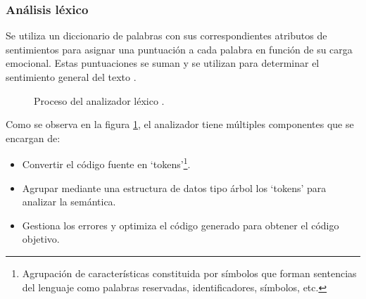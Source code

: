 \documentclass[12pt,twoside]{article}
\begin{document}
	\subsubsection{Análisis léxico}
	Se utiliza un diccionario de palabras con sus correspondientes atributos de sentimientos para asignar una puntuación a cada palabra en función de su carga emocional. Estas puntuaciones se suman y se utilizan para determinar el sentimiento general del texto \cite{info: pln3}.
	
	\begin{figure}[H]
		\centering
		\caption{Proceso del analizador léxico \cite{info: analizador_lexico}.}
		\label{img: analizador_lexico}
	\end{figure}
	
	Como se observa en la figura \ref{img: analizador_lexico}, el analizador tiene múltiples componentes que se encargan de:
	
	\begin{itemize}
		\item Convertir el código fuente en `tokens'\footnote{Agrupación de características constituida por símbolos  que forman sentencias del lenguaje como palabras reservadas, identificadores, símbolos, etc.}.
		\item Agrupar mediante una estructura de datos tipo árbol los `tokens' para analizar la semántica.
		\item Gestiona los errores y optimiza el código generado para obtener el código objetivo.
	\end{itemize}
	
\end{document}
